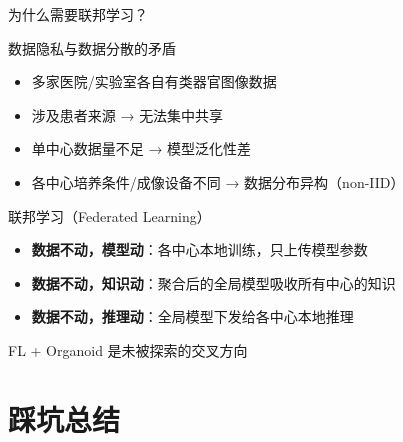 \documentclass[aspectratio=169, 10pt]{beamer}
\begin{document}
\begin{frame}{为什么需要联邦学习？}
  \begin{block}{数据隐私与数据分散的矛盾}
    \begin{itemize}
      \item 多家医院/实验室各自有类器官图像数据
      \item 涉及患者来源 → \alert{无法集中共享}
      \item 单中心数据量不足 → 模型泛化性差
      \item 各中心培养条件/成像设备不同 → 数据分布异构（non-IID）
    \end{itemize}
  \end{block}
  \vspace{0em}
  \begin{block}{联邦学习（Federated Learning）}
    \begin{itemize}
      \item \textbf{数据不动，模型动}：各中心本地训练，只上传模型参数
      \item \textbf{数据不动，知识动}：聚合后的全局模型吸收所有中心的知识
      \item \textbf{数据不动，推理动}：全局模型下发给各中心本地推理
    \end{itemize}
  \end{block}
  \vspace{0em}
  \centering\alert{FL + Organoid 是未被探索的交叉方向}
\end{frame}

\section{踩坑总结}
\end{document}
